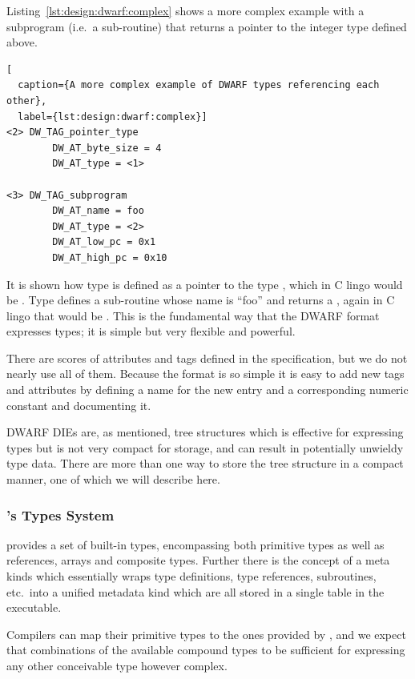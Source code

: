 Listing~\ref{lst:design:dwarf:complex} shows a more complex example with a
subprogram (i.e.~a sub-routine) that returns a pointer to the integer type
defined above.

\begin{lstlisting}[
  caption={A more complex example of DWARF types referencing each other},
  label={lst:design:dwarf:complex}]
<2> DW_TAG_pointer_type
        DW_AT_byte_size = 4
        DW_AT_type = <1>

<3> DW_TAG_subprogram
        DW_AT_name = foo
        DW_AT_type = <2>
        DW_AT_low_pc = 0x1
        DW_AT_high_pc = 0x10
\end{lstlisting}

It is shown how type  is defined as a pointer to the type ,
which in C lingo would be . Type  defines a sub-routine
whose name is ``foo'' and returns a , again in C lingo that would be
. This is the fundamental way that the DWARF format
expresses types; it is simple but very flexible and powerful.

There are scores of attributes and tags defined in the specification, but we do
not nearly use all of them. Because the format is so simple it is easy to add
new tags and attributes by defining a name for the new entry and a corresponding
numeric constant and documenting it.

DWARF DIEs are, as mentioned, tree structures which is effective for expressing
types but is not very compact for storage, and can result in potentially
unwieldy type data. There are more than one way to store the tree structure in a
compact manner, one of which we will describe here. %

\subsubsection{\thename{}'s Types System}

\thename{} provides a set of built-in types, encompassing both primitive types
as well as references, arrays and composite types. Further there is the concept
of a meta kinds which essentially wraps type definitions, type references,
subroutines, etc.~into a unified metadata kind which are all stored in a single
table in the executable.

Compilers can map their primitive types to the ones provided by \thename{}, and
we expect that combinations of the available compound types to be sufficient for
expressing any other conceivable type however complex.

